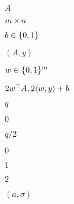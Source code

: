 \documentclass[10pt]{book}
\begin{document}
\begin{mdSnippets}
\begin{mdInlineSnippet}[7fc56270e7a70fa81a5935b72eacbe29]%
$A$\end{mdInlineSnippet}%
\begin{mdInlineSnippet}[c4f729d02a67ac278165d81c624944ca]%
$m\times n$\end{mdInlineSnippet}%
\begin{mdInlineSnippet}%
$b\in\{0,1\}$\end{mdInlineSnippet}%
\begin{mdInlineSnippet}[d336fe65a1b9e2baa5f2424b11c4cb7a]%
$(A,y)$\end{mdInlineSnippet}%
\begin{mdInlineSnippet}[095d992971d59b623b95f5dca90a9be0]%
$w\in\{0,1\}^m$\end{mdInlineSnippet}%
\begin{mdInlineSnippet}[41287cf42352e01e923978d7a7ac3fca]%
$2w^\top A, 2\langle w,y \rangle+b$\end{mdInlineSnippet}%
\begin{mdInlineSnippet}[7694f4a66316e53c8cdd9d9954bd611d]%
$q$\end{mdInlineSnippet}%
\begin{mdInlineSnippet}%
$0$\end{mdInlineSnippet}%
\begin{mdInlineSnippet}%
$q/2$\end{mdInlineSnippet}%
\begin{mdInlineSnippet}%
$0$\end{mdInlineSnippet}%
\begin{mdInlineSnippet}[c4ca4238a0b923820dcc509a6f75849b]%
$1$\end{mdInlineSnippet}%
\begin{mdInlineSnippet}[c81e728d9d4c2f636f067f89cc14862c]%
$2$\end{mdInlineSnippet}%
\begin{mdInlineSnippet}%
$(a,\sigma)$\end{mdInlineSnippet}%
\begin{mdInlineSnippet}%

\end{mdInlineSnippet}
\end{mdSnippets}
\end{document}
